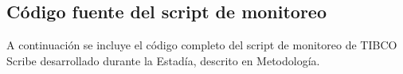 \documentclass[12pt]{article}
\begin{document}
\subsection*{Código fuente del script de monitoreo}

A continuación se incluye el código completo del script de monitoreo de TIBCO Scribe desarrollado durante la Estadía, descrito en Metodología.



\clearpage
\thispagestyle{fancy}


\clearpage
\thispagestyle{fancy}


\clearpage
\thispagestyle{fancy}


\clearpage
\thispagestyle{fancy}


\clearpage
\newcommand{\SizeFont}{\footnotesize}
\end{document}

